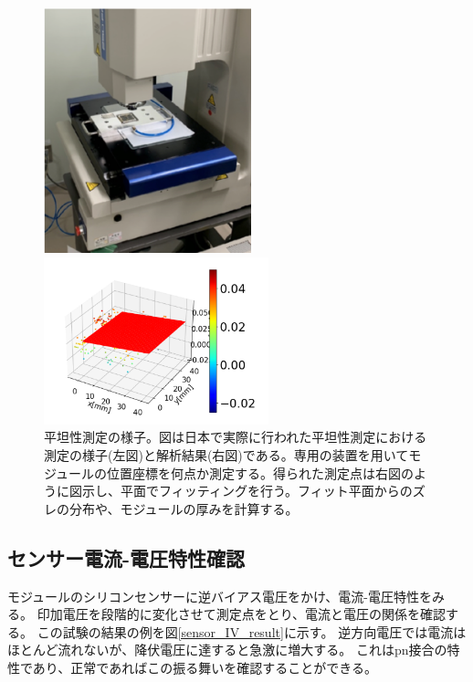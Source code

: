 \begin{figure}[bpt]\centering
  \begin{minipage}{0.4\hsize}
    \begin{center}
    \includegraphics[width=60mm]{./Metrology_setup.png}
    \end{center}
  \end{minipage}
  \begin{minipage}{0.4\hsize}
    \begin{center}
    \includegraphics[width=65mm]{./Metrology_analysis.png}
    \end{center}
  \end{minipage}
  \caption[平坦性測定の様子。]{平坦性測定の様子。図は日本で実際に行われた平坦性測定における測定の様子(左図)と解析結果(右図)である。専用の装置を用いてモジュールの位置座標を何点か測定する。得られた測定点は右図のように図示し、平面でフィッティングを行う。フィット平面からのズレの分布や、モジュールの厚みを計算する。}
  \label{Metrology_overview}
\end{figure}

\clearpage
\subsection{センサー電流-電圧特性確認}
モジュールのシリコンセンサーに逆バイアス電圧をかけ、電流-電圧特性をみる。
印加電圧を段階的に変化させて測定点をとり、電流と電圧の関係を確認する。
この試験の結果の例を図\ref{sensor_IV_result}に示す。
逆方向電圧では電流はほとんど流れないが、降伏電圧に達すると急激に増大する。
これはpn接合の特性\cite{2-1}であり、正常であればこの振る舞いを確認することができる。

